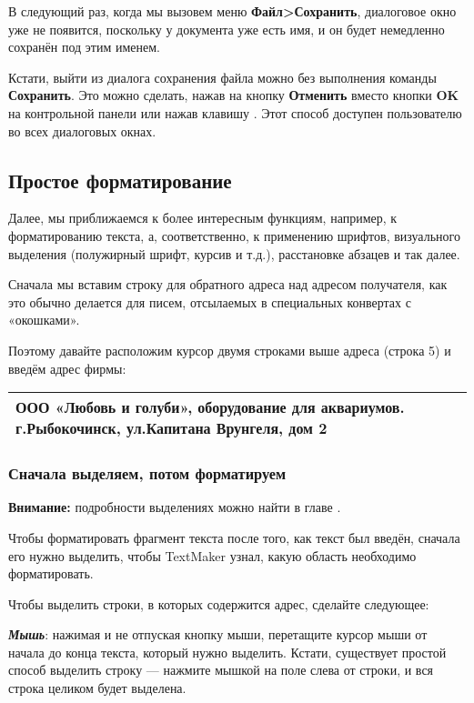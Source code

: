 ﻿\documentclass[a4paper,10pt]{article}
\begin{document}
В следующий раз, когда мы вызовем меню \textbf{Файл>Сохранить}, диалоговое окно уже не появится, поскольку у документа уже есть имя, и он будет немедленно сохранён под этим именем.

Кстати, выйти из диалога сохранения файла можно без выполнения команды \textbf{Сохранить}. Это можно сделать, нажав на кнопку \textbf{Отменить} вместо кнопки \textbf{OK} на контрольной панели или нажав клавишу . Этот способ доступен пользователю во всех диалоговых окнах.

\subsection{Простое форматирование}
Далее, мы приближаемся к более интересным функциям, например, к форматированию текста, а, соответственно, к применению шрифтов, визуального выделения (полужирный шрифт, курсив и т.д.), расстановке абзацев и так далее.

Сначала мы вставим строку для обратного адреса над адресом получателя, как это обычно делается для писем, отсылаемых в специальных конвертах с «окошками».

Поэтому давайте расположим курсор двумя строками выше адреса (строка 5) и введём адрес фирмы:

\begin{center}
\begin{tabular}{ | m{15cm} | }
\hline
ООО «Любовь и голуби»,  оборудование для аквариумов. г.Рыбокочинск, ул.Капитана Врунгеля, дом 2\\
\hline
\end{tabular}
\end{center}

\subsubsection{Сначала выделяем, потом форматируем}
\textbf{Внимание:} подробности выделениях можно найти в главе .

Чтобы форматировать фрагмент текста после того, как текст был введён, сначала его нужно выделить, чтобы TextMaker узнал, какую область необходимо форматировать.

Чтобы выделить строки, в которых содержится адрес, сделайте следующее:

\textbf{\textit{Мышь}}: нажимая и не отпуская кнопку мыши, перетащите курсор мыши от начала до конца текста, который нужно выделить. Кстати, существует простой способ выделить строку — нажмите мышкой на поле слева от  строки, и вся строка целиком будет выделена.
\end{document}
